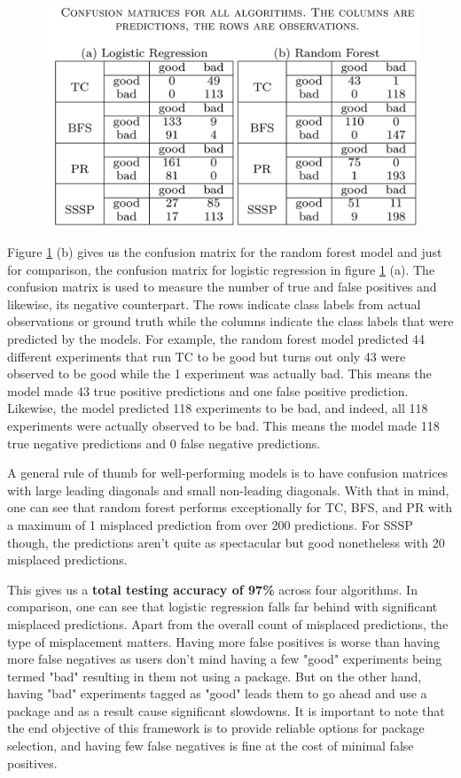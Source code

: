 \begin{figure}
    \centering
    \includegraphics[width=1\columnwidth]{figures/classification_results.png}
    \caption{}
    \label{Confusion matrix}
\end{figure}

Figure \ref{Confusion matrix} (b) gives us the confusion matrix for the random forest model and just for comparison, the confusion matrix for logistic regression in figure \ref{Confusion matrix} (a). The confusion matrix is used to measure the number of true and false positives and likewise, its negative counterpart. The rows indicate class labels from actual observations or ground truth while the columns indicate the class labels that were predicted by the models. For example, the random forest model predicted 44 different experiments that run TC to be good but turns out only 43 were observed to be good while the 1 experiment was actually bad. This means the model made 43 true positive predictions and one false positive prediction. Likewise, the model predicted 118 experiments to be bad, and indeed, all 118 experiments were actually observed to be bad. This means the model made 118 true negative predictions and 0 false negative predictions.

A general rule of thumb for well-performing models is to have confusion matrices with large leading diagonals and small non-leading diagonals. With that in mind, one can see that random forest performs exceptionally for TC, BFS, and PR with a maximum of 1 misplaced prediction from over 200 predictions. For SSSP though, the predictions aren't quite as spectacular but good nonetheless with 20 misplaced predictions. 

This gives us a \textbf{total testing accuracy of 97\%} across four algorithms. In comparison, one can see that logistic regression falls far behind with significant misplaced predictions. Apart from the overall count of misplaced predictions, the type of misplacement matters. Having more false positives is worse than having more false negatives as users don't mind having a few "good" experiments being termed "bad" resulting in them not using a package. But on the other hand, having "bad" experiments tagged as "good" leads them to go ahead and use a package and as a result cause significant slowdowns. It is important to note that the end objective of this framework is to provide reliable options for package selection, and having few false negatives is fine at the cost of minimal false positives.

